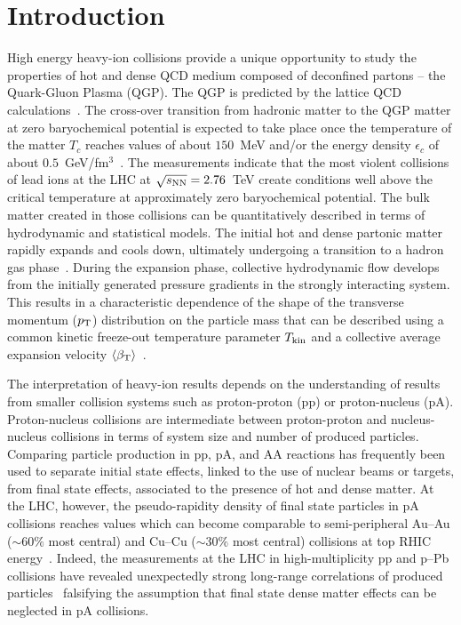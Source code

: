 \section{Introduction}
\label{sec:Intro}


High energy heavy-ion collisions provide a unique opportunity to study the properties of hot and dense QCD medium composed of deconfined partons -- the Quark-Gluon Plasma (QGP).
The QGP is predicted by the lattice QCD calculations~\cite{Satz:2000bn,Bass:1998vz,Shuryak:1984nq,Cleymans:1985wb}.
The cross-over transition from hadronic matter to the QGP matter at zero baryochemical potential is expected to take place once the temperature of the matter $T_{c}$ reaches values of about $150$~MeV and/or the energy density $\epsilon_{c}$ of about $0.5$~GeV/fm$^3$~\cite{Borsanyi:2010cj,Bhattacharya:2014ara}.
The measurements indicate that the most violent collisions of lead ions at the LHC at $\sqrt{s_{\rm NN}}=2.76$~TeV create conditions well above the critical temperature at approximately zero baryochemical potential.
The bulk matter created in those collisions can be quantitatively described in terms of hydrodynamic and statistical models.
The initial hot and dense partonic matter rapidly expands and cools down, ultimately undergoing a transition to a hadron gas phase~\cite{Muller:2006ee}.
During the expansion phase, collective hydrodynamic flow develops from the initially generated pressure gradients in the strongly interacting system.
This results in a characteristic dependence of the shape of the transverse momentum ($\pT$) distribution on the particle mass that can be described using a common kinetic freeze-out temperature parameter $T_{\rm kin}$ and a collective average expansion velocity $\left\langle \beta_{\rm T}\right\rangle$~\cite{Schnedermann:1993ws}.

The interpretation of heavy-ion results depends on the understanding of results from smaller collision
systems such as proton-proton (pp) or proton-nucleus (pA). Proton-nucleus collisions are intermediate between proton-proton and nucleus-nucleus collisions in terms of system size and number of produced particles.
Comparing particle production in pp, pA, and AA reactions has frequently been used to separate initial state effects, linked to the use of nuclear beams or targets, from final state effects, associated to the presence of hot and dense matter.
At the LHC, however, the pseudo-rapidity density of final state particles in pA collisions reaches values which can become comparable to semi-peripheral Au--Au ($\sim 60\%$ most central) and Cu--Cu ($\sim 30\%$ most central) collisions at top RHIC energy~\cite{Alver:2010ck}.
Indeed, the measurements at the LHC in high-multiplicity pp and p--Pb collisions have revealed unexpectedly strong long-range correlations of produced particles~\cite{Khachatryan:2010gv,CMS:2012qk,Abelev:2012ola,Aad:2012gla,Aad:2013fja,Chatrchyan:2013nka} falsifying the assumption that final state dense matter effects can be neglected in pA collisions.

